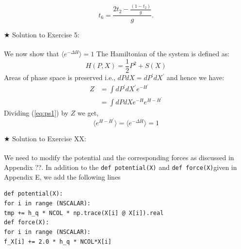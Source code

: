 \documentclass[11pt]{article}
\newcommand\tab[1][1cm]{\hspace*{#1}}
\begin{document}
     \begin{equation}
     	t_{6} = \frac{2t_{2} - \frac{(1-t_{2})}{g}}{g}. 
     \end{equation} 

\noindent $\bigstar$ Solution to Exercise 5:
\\ \\  We now show that $ \langle e^{-\Delta H} \rangle = 1$ 
The Hamiltonian of the system is defined as:
\begin{equation}
	H(P,X) = \frac{1}{2}P^2  + S(X)
\end{equation} 
Areas of phase space is preserved i.e., $dP dX = dP^{\prime} dX^{\prime}$
and hence we have:
\begin{align}
	\label{eq:ps1} 
	Z &= \int dP^{\prime} dX^{\prime} e^{-H^{\prime} \nonumber }  \\
	&=  \int dP dX e^{-H} e^{H-H^{\prime}}
\end{align}
Dividing (\ref{eq:ps1}) by $Z$ we get, 
\begin{equation}
	\langle e^{H-H^{\prime}} \rangle = 	\langle e^{-\Delta H} \rangle = 1
\end{equation}

\noindent $\bigstar$ Solution to Exercise XX:
\\ \\  

We need to modify the potential and the corresponding forces as 
discussed in Appendix ??. In addition to the \verb"def potential(X)" 
and \verb"def force(X)"given in Appendix E, we add the following lines 

\begin{footnotesize} 

\begin{mdframed}[backgroundcolor=blue!3] 
 \verb"def potential(X):" \\
 \tab	\verb"for i in range (NSCALAR):" \\ 
    \tab     \tab	\verb"tmp += h_q * NCOL * np.trace(X[i] @ X[i]).real" \\
    
\vspace{5mm} 
\noindent
\verb"def force(X):" \\ 
\tab	\verb"for i in range (NSCALAR):"  \\ 
       \tab  \tab 	\verb"f_X[i] += 2.0 * h_q * NCOL*X[i] "  

\end{mdframed}
\end{footnotesize}





\end{document}
